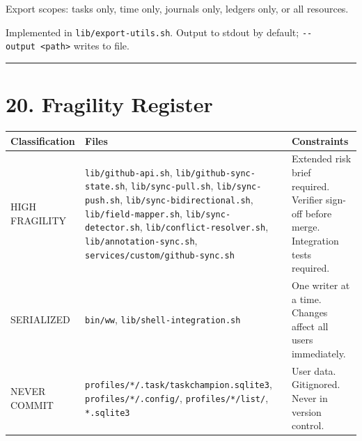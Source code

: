 \documentclass[
]{article}
\newcounter{none} %
\begin{document}
Export scopes: tasks only, time only, journals only, ledgers only, or
all resources.

Implemented in \texttt{lib/export-utils.sh}. Output to stdout by
default; \texttt{-\/-output\ \textless{}path\textgreater{}} writes to
file.

\begin{center}\rule{0.5\linewidth}{0.5pt}\end{center}

\section{20. Fragility Register}\label{fragility-register}

{\def\LTcaptype{none} %
\begin{longtable}[]{@{}
  >{\raggedright\arraybackslash}p{}
  >{\raggedright\arraybackslash}p{}
  >{\raggedright\arraybackslash}p{}@{}}
\toprule\noalign{}
\begin{minipage}[b]{\linewidth}\raggedright
Classification
\end{minipage} & \begin{minipage}[b]{\linewidth}\raggedright
Files
\end{minipage} & \begin{minipage}[b]{\linewidth}\raggedright
Constraints
\end{minipage} \\
\midrule\noalign{}
\endhead
\bottomrule\noalign{}
\endlastfoot
HIGH FRAGILITY & \texttt{lib/github-api.sh},
\texttt{lib/github-sync-state.sh}, \texttt{lib/sync-pull.sh},
\texttt{lib/sync-push.sh}, \texttt{lib/sync-bidirectional.sh},
\texttt{lib/field-mapper.sh}, \texttt{lib/sync-detector.sh},
\texttt{lib/conflict-resolver.sh}, \texttt{lib/annotation-sync.sh},
\texttt{services/custom/github-sync.sh} & Extended risk brief required.
Verifier sign-off before merge. Integration tests required. \\
SERIALIZED & \texttt{bin/ww}, \texttt{lib/shell-integration.sh} & One
writer at a time. Changes affect all users immediately. \\
NEVER COMMIT & \texttt{profiles/*/.task/taskchampion.sqlite3},
\texttt{profiles/*/.config/}, \texttt{profiles/*/list/},
\texttt{*.sqlite3} & User data. Gitignored. Never in version control. \\
\end{longtable}
}
\end{document}
